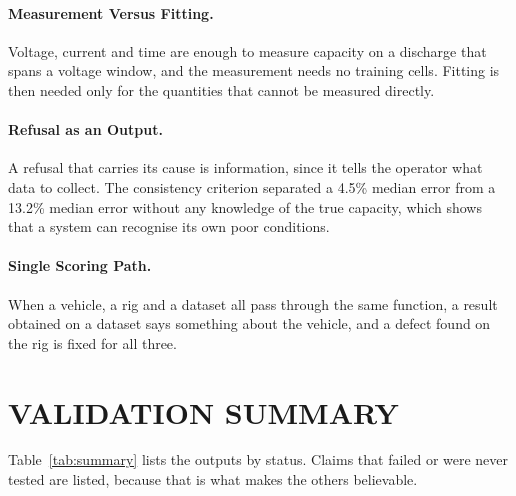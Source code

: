 \paragraph{Measurement Versus Fitting.} Voltage, current and time are enough to measure capacity on a discharge that spans a voltage window, and the measurement needs no training cells. Fitting is then needed only for the quantities that cannot be measured directly.

\paragraph{Refusal as an Output.} A refusal that carries its cause is information, since it tells the operator what data to collect. The consistency criterion separated a 4.5\% median error from a 13.2\% median error without any knowledge of the true capacity, which shows that a system can recognise its own poor conditions.

\paragraph{Single Scoring Path.} When a vehicle, a rig and a dataset all pass through the same function, a result obtained on a dataset says something about the vehicle, and a defect found on the rig is fixed for all three.

\section{VALIDATION SUMMARY}

Table~\ref{tab:summary} lists the outputs by status. Claims that failed or were never tested are listed, because that is what makes the others believable.

